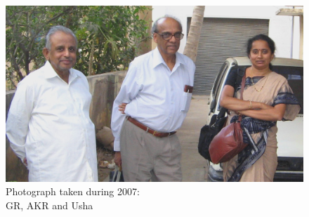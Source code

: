 \begin{figure}[H]
\centering
\includegraphics[scale=0.21]{src/images/chap18/001.eps}
\caption{Photograph taken during 2007:\\ GR, AKR and Usha}\label{chap18-fig001}
\end{figure}

